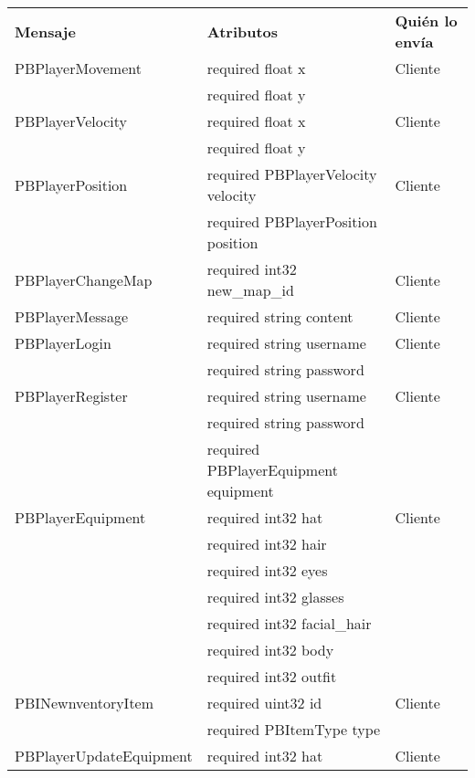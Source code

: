 \label{apendix:protobuf}
\begin{longtable}{|p{}|p{}|p{}|}
    \hline
    \textbf{Mensaje} & \textbf{Atributos} & \textbf{Quién lo envía} \\
    PBPlayerMovement & required float x & Cliente \\
                        & required float y & \\
    \hline
    PBPlayerVelocity & required float x & Cliente \\
                        & required float y & \\
    \hline
    PBPlayerPosition & required PBPlayerVelocity velocity & Cliente \\
                        & required PBPlayerPosition position & \\
    \hline
    PBPlayerChangeMap & required int32 new\_map\_id & Cliente \\
    \hline
    PBPlayerMessage & required string content & Cliente \\
    \hline
    PBPlayerLogin & required string username & Cliente \\
                    & required string password & \\
    \hline
    PBPlayerRegister & required string username & Cliente \\
                        & required string password & \\
                        & required PBPlayerEquipment equipment & \\
    \hline
    PBPlayerEquipment & required int32 hat & Cliente \\
                        & required int32 hair & \\
                        & required int32 eyes & \\
                        & required int32 glasses & \\
                        & required int32 facial\_hair & \\
                        & required int32 body & \\
                        & required int32 outfit & \\
    \hline
    PBINewnventoryItem & required uint32 id & Cliente \\
                        & required PBItemType type & \\
    \hline
    PBPlayerUpdateEquipment & required int32 hat & Cliente \\

\end{longtable}
